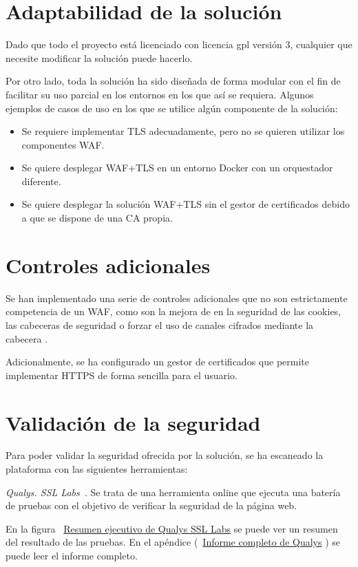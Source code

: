 \section{Adaptabilidad de la solución}
\par Dado que todo el proyecto está licenciado con licencia \acrlong{gpl} versión 3, cualquier que necesite modificar la solución puede hacerlo.
\par Por otro lado, toda la solución ha sido diseñada de forma modular con el fin de facilitar su uso parcial en los entornos en los que así se requiera. Algunos ejemplos de casos de uso en los que se utilice algún componente de la solución: 
\begin{itemize}
\item Se requiere implementar TLS adecuadamente, pero no se quieren utilizar los componentes WAF.
\item Se quiere desplegar WAF+TLS en un entorno Docker con un orquestador diferente.
\item Se quiere desplegar la solución WAF+TLS sin el gestor de certificados debido a que se dispone de una CA propia.
\end{itemize}

\section{Controles adicionales}
\par Se han implementado una serie de controles adicionales que no son estrictamente competencia de un WAF, como son la mejora de en la seguridad de las cookies, las cabeceras de seguridad o forzar el uso de canales
cifrados mediante la cabecera \cite{hsts}.
\par Adicionalmente, se ha configurado un gestor de certificados que permite implementar HTTPS de forma sencilla para el usuario.

\section{Validación de la seguridad}
Para poder validar la seguridad ofrecida por la solución, se ha escaneado la plataforma con las siguientes herramientas:
\par {\em Qualys. SSL Labs~\cite{ssllabs}}. Se trata de una herramienta online que ejecuta una batería de pruebas con el objetivo de verificar la seguridad de la página web.
\par En la figura ~\hyperref[tabla:resumenqualys]{Resumen ejecutivo de Qualys SSL Labs} se puede ver un resumen del resultado de las pruebas. En el apéndice
(~\hyperref[tabla:informequalys]{Informe completo de Qualys} ) se puede leer el informe completo.

